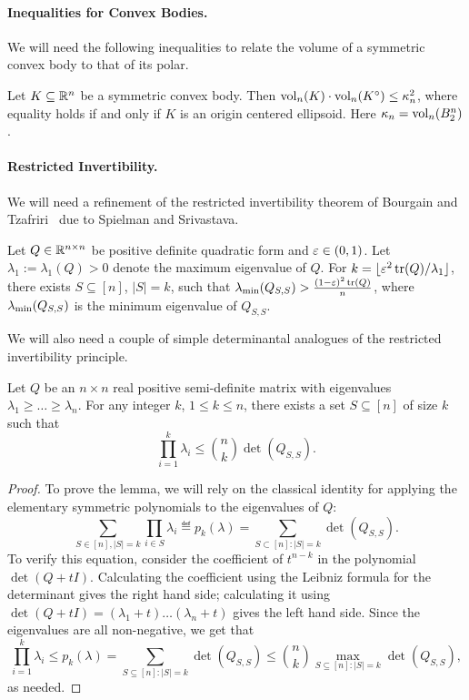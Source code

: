 \paragraph{\bf Inequalities for Convex Bodies.} We will need the following
inequalities to relate the volume of a symmetric convex body to that of its
polar.

\begin{theorem}\label{thm:santalo} 
Let $K \subseteq {\mathbb{R}}^n$ be a symmetric convex body. Then $\operatorname{vol}_n(K)\cdot
\operatorname{vol}_n(K^\circ) \leq \kappa_n^2$, where equality holds if and only if $K$ is
an origin centered ellipsoid. Here $\kappa_n = \operatorname{vol}_n(B_2^n)$.
\end{theorem}

\paragraph{\bf Restricted Invertibility.}

We will need a refinement of the restricted invertibility theorem of Bourgain
and Tzafriri~\cite{bour-tza} due to Spielman and Srivastava.

\begin{theorem}\label{thm:rest-inv}
Let $Q \in {\mathbb{R}}^{n \times n}$ be positive definite quadratic form and $\varepsilon \in
(0,1)$. Let $\lambda_1 := \lambda_1(Q) > 0$ denote the maximum eigenvalue of
$Q$.  For $k = \lfloor \varepsilon^2 \operatorname{tr}(Q)/\lambda_1 \rfloor$, there exists $S \subseteq [n]$,
$|S|=k$, such that $\lambda_{\rm min}(Q_{S,S}) > \frac{(1-\varepsilon)^2\operatorname{tr}(Q)}{n}$,
where $\lambda_{\rm min}(Q_{S,S})$ is the minimum eigenvalue of $Q_{S,S}$.
\end{theorem}

We will also need a couple of simple determinantal analogues of the restricted
invertibility principle.

\begin{lemma}\label{lm:rip-det}
  Let $Q$ be an $n\times n$ real positive semi-definite matrix with
  eigenvalues $\lambda_1 \ge \ldots \ge \lambda_n$. For any integer
  $k$, $1 \le k \le n$, there exists a set $S \subseteq [n]$ of size $k$
  such that
  \[\prod_{i=1}^k \lambda_i \leq \binom{n}{k} \det(Q_{S,S}).\]
\end{lemma}
\begin{proof}
To prove the lemma, we will rely on the classical identity for applying the
elementary symmetric polynomials to the eigenvalues of $Q$:
\begin{equation*}
\sum_{S \in [n],|S|=k} \prod_{i \in S} \lambda_i \eqdef p_k(\lambda) = \sum_{S \subset [n]: |S| = k}\det(Q_{S,S}).
\end{equation*}
To verify this equation, consider the coefficient of $t^{n-k}$ in the polynomial
$\det(Q + tI)$. Calculating the coefficient using the Leibniz formula for the
determinant gives the right hand side; calculating it using $\det(Q + tI) =
(\lambda_1 + t)\ldots(\lambda_n + t)$ gives the left hand side. Since the 
eigenvalues are all non-negative, we get that
\[
\prod_{i=1}^k \lambda_i \leq p_k(\lambda) =  
 \sum_{S \subseteq [n]: |S|=k} \det(Q_{S,S}) \leq \binom{n}{k} \max_{S
\subseteq [n]: |S|=k} \det(Q_{S,S}),
\]
as needed.
\end{proof}

